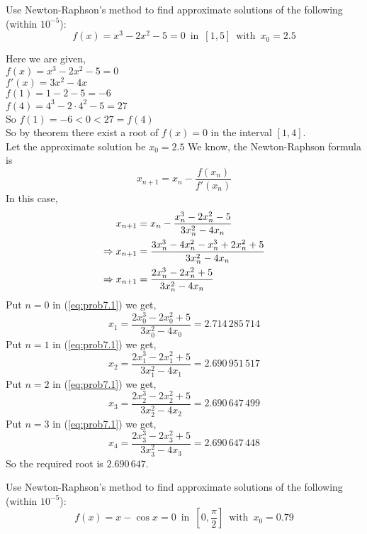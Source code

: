 \documentclass[12pt,class=book,crop=false]{standalone}
\begin{document}
\begin{prob}
    Use Newton-Raphson's method to find approximate solutions of the following (within \( 10^{-5} \)):
    \[f(x)=x^3-2x^2-5=0 \,\text{ in }\,[1,5]\,\text{ with }\,x_0=2.5\]
\end{prob}
\begin{soln}
    Here we are given,\\
    \indent \( f(x)=x^3-2x^2-5=0 \)\\
    \indent \( f'(x)=3x^2-4x \)\\
    \indent \( f(1)=1-2-5=-6\)\\
    \indent \(f(4)=4^3-2\cdot 4^2-5=27 \)\\
    So \( f(1)=-6<0<27=f(4)\)\\
    So by theorem there exist a root of \( f(x)=0 \) in the interval \( [1,4] \).\\
    Let the approximate solution be \( x_0=2.5 \)
    We know, the Newton-Raphson formula is
    \[
        x_{n+1}=x_n-\frac{f(x_n)}{f'(x_n)}
    \]
    In this case,
    \begin{align}
        x_{n+1}             & =x_n-\frac{x_n^3-2x_n^2-5}{3x_n^2-4x_n}\notag           \\
        \Rightarrow x_{n+1} & =\frac{3x_n^3-4x_n^2-x_n^3+2x_n^2+5}{3x_n^2-4x_n}\notag \\
        \Rightarrow x_{n+1} & =\frac{2x_n^3-2x_n^2+5}{3x_n^2-4x_n}\label{eq:prob7.1}
    \end{align}
    Put \( n=0 \) in (\ref{eq:prob7.1}) we get,
    \[
        x_{1} =\frac{2x_0^3-2x_0^2+5}{3x_0^2-4x_0}=2.714\,285\,714
    \]
    Put \( n=1 \) in (\ref{eq:prob7.1}) we get,
    \[
        x_{2} =\frac{2x_1^3-2x_1^2+5}{3x_1^2-4x_1}=2.690\,951\,517
    \]
    Put \( n=2 \) in (\ref{eq:prob7.1}) we get,
    \[
        x_{3} =\frac{2x_2^3-2x_2^2+5}{3x_2^2-4x_2}=2.690\,647\,499
    \]
    Put \( n=3 \) in (\ref{eq:prob7.1}) we get,
    \[
        x_{4} =\frac{2x_3^3-2x_3^2+5}{3x_3^2-4x_3}=2.690\,647\,448
    \]
    So the required root is \( 2.690\,647 \).
\end{soln}
\begin{prob}
    Use Newton-Raphson's method to find approximate solutions of the following (within \( 10^{-5} \)):
    \[f(x)=x-\cos x=0 \,\text{ in }\,\left[0,\frac{\pi}{2}\right]\,\text{ with }\,x_0=0.79\]
\end{prob}
\end{document}
